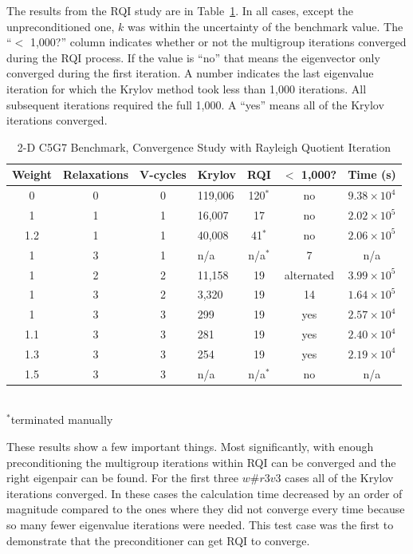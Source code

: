 The results from the RQI study are in Table~\ref{table:2-D c5g7 rqi}. In all cases, except the unpreconditioned one, $k$ was within the uncertainty of the benchmark value. The ``$<$ 1,000?'' column indicates whether or not the multigroup iterations converged during the RQI process. If the value is ``no'' that means the eigenvector only converged during the first iteration. A number indicates the last eigenvalue iteration for which the Krylov method took less than 1,000 iterations. All subsequent iterations required the full 1,000. A ``yes'' means all of the Krylov iterations converged.
%
\begin{table}[!h]
\caption{2-D C5G7 Benchmark, Convergence Study with Rayleigh Quotient Iteration}
\begin{center}
\begin{tabular}{| c | c | c | l | c | c | c |}
\hline
Weight & Relaxations & V-cycles & Krylov & RQI & $<$ 1,000? & Time (s) \\[0.5ex]
\hline
0    & 0 & 0 & 119,006 & 120$^{*}$ & no & $9.38 \times 10^{4}$ \\
1    & 1 & 1 & 16,007   & 17            & no & $2.02 \times 10^{5}$ \\
1.2 & 1 & 1 & 40,008   & 41$^{*}$   & no & $2.06 \times 10^{5}$ \\
1    & 3 & 1 & n/a         & n/a$^{*}$  & 7   & n/a \\
1    & 2 & 2 & 11,158   & 19            & alternated & $3.99 \times 10^{5}$ \\
1    & 3 & 2 & 3,320     & 19            & 14 & $1.64 \times 10^{5}$ \\
\hline
1    & 3 & 3 & 299        & 19            & yes & $2.57 \times 10^{4}$ \\
1.1 & 3 & 3 & 281        & 19            & yes & $2.40 \times 10^{4}$ \\
1.3 & 3 & 3 & 254        & 19            & yes & $2.19 \times 10^{4}$ \\
1.5 & 3 & 3 & n/a         & n/a$^{*}$ & no & n/a \\
\hline 
\end{tabular} \\
$^{*}$terminated manually
\end{center}
\label{table:2-D c5g7 rqi}
\end{table}
%

These results show a few important things. Most significantly, with enough preconditioning the multigroup iterations within RQI can be converged and the right eigenpair can be found. For the first three $w\#r3v3$ cases all of the Krylov iterations converged. In these cases the calculation time decreased by an order of magnitude compared to the ones where they did not converge every time because so many fewer eigenvalue iterations were needed. This test case was the first to demonstrate that the preconditioner can get RQI to converge. 

